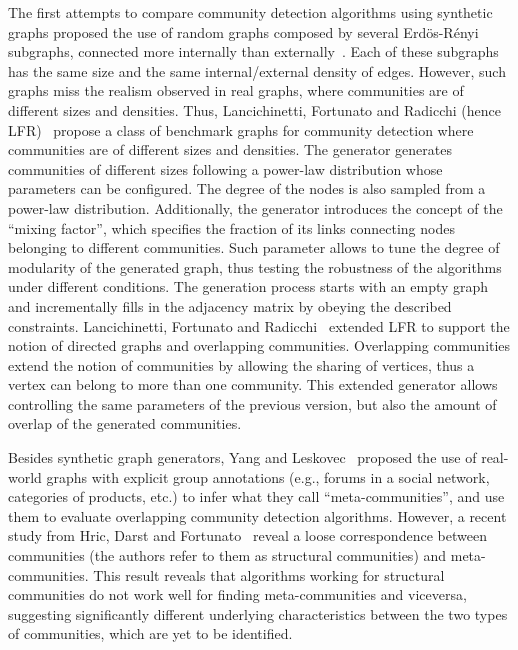The first attempts to compare community detection algorithms using synthetic graphs proposed the use of random graphs composed by several Erd\"{o}s-R\'{e}nyi subgraphs, connected more internally than externally~\cite{danon2005comparing}. Each of these subgraphs has the same size and the same internal/external density of edges. However, such graphs miss the realism observed in real graphs, where communities are of different sizes and densities. Thus, Lancichinetti, Fortunato and Radicchi (hence LFR)~\cite{PhysRevE.78.046110} propose a class of benchmark graphs for community detection where communities are of different sizes and densities. The generator generates communities of different sizes following a power-law distribution whose parameters can be configured. The degree of the nodes is also sampled from a power-law distribution. Additionally, the generator introduces the concept of the ``mixing factor'', which specifies the fraction of its links connecting nodes belonging to different communities. Such parameter allows to tune the degree of modularity of the generated graph, thus testing the robustness of the algorithms under different conditions. The generation process starts with an empty graph and incrementally fills in the adjacency matrix by obeying the described constraints. Lancichinetti, Fortunato and Radicchi~\cite{PhysRevE.80.016118} extended LFR to support the notion of directed graphs and overlapping communities. Overlapping communities extend the notion of communities by allowing the sharing of vertices, thus a vertex can belong to more than one community. This extended generator allows controlling the same parameters of the previous version, but also the amount of overlap of the generated communities.

Besides synthetic graph generators, Yang and Leskovec~\cite{yang2015defining} proposed the use of real-world graphs with explicit group annotations (e.g., forums in a social network, categories of products, etc.) to infer what they call ``meta-communities'', and use them to evaluate overlapping community detection algorithms. However, a recent study from Hric, Darst and Fortunato~\cite{hric2014community} reveal a loose correspondence between  communities (the authors refer to them as structural communities) and meta-communities.  This result reveals that  algorithms working for structural communities do not work well for finding meta-communities and viceversa, suggesting significantly different underlying characteristics between the two types of communities, which are yet to be identified.

